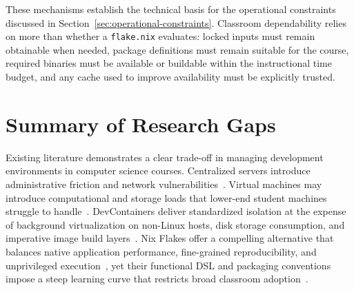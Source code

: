 These mechanisms establish the technical basis for the operational constraints discussed
in Section~\ref{sec:operational-constraints}. Classroom dependability relies on
more than whether a \texttt{flake.nix} evaluates: locked inputs must remain
obtainable when needed, package definitions must remain suitable for the course,
required binaries must be available or buildable within the instructional time
budget, and any cache used to improve availability must be explicitly trusted.

\section{Summary of Research Gaps}
\label{sec:research-gaps}

Existing literature demonstrates a clear trade-off in managing development
environments in computer science courses. Centralized servers introduce administrative
friction and network vulnerabilities~\cite{valstarUsingDevContainersStandardize2020,malanContainerizingCS50Standardizing2024}.
Virtual machines may introduce computational and storage loads that lower-end
student machines struggle to handle~\cite{malanContainerizingCS50Standardizing2024,stokerUsingVirtualMachines2013}.
DevContainers deliver standardized isolation at the expense of background virtualization
on non-Linux hosts, disk storage consumption, and imperative image build layers~\cite{valstarUsingDevContainersStandardize2020,NixBetterDocker2024}.
Nix Flakes offer a compelling alternative that balances native application
performance, fine-grained reproducibility, and unprivileged execution~\cite{5BuildingReproducible,duNixRescueReproducible2026a},
yet their functional DSL and packaging conventions impose a steep learning curve that
restricts broad classroom adoption~\cite{duNixRescueReproducible2026a,OSCodeMy2024,hauschImprovingReproducibilityScientific2025}.

